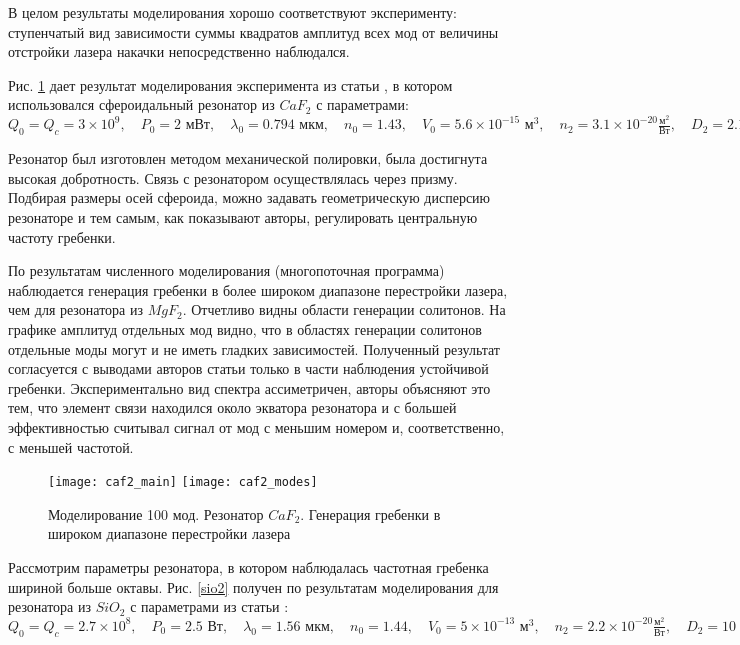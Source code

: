 В целом результаты моделирования хорошо соответствуют эксперименту: ступенчатый вид зависимости суммы квадратов амплитуд всех мод от величины отстройки лазера накачки непосредственно наблюдался.

Рис. \ref{caf2} дает результат моделирования эксперимента из статьи \cite{Savchenkov2011}, в котором использовался сфероидальный резонатор из $CaF_2$ с параметрами:
$
Q_0=Q_c=3\times10^9,\quad
P_0=2\text{ мВт},\quad
\lambda_0=0.794\text{ мкм}, \quad
n_0=1.43,\quad
V_0=5.6\times10^{-15}\text{ м}^3,\quad
n_2=3.1\times10^{-20}\frac{\text{м}^2}{\text{Вт}},\quad
D_2=2.1\times10^4\text{ Гц},\quad
D_3=0\text{ Гц}.$

Резонатор был изготовлен методом механической полировки, была достигнута высокая добротность. Связь с резонатором осуществлялась через призму. Подбирая размеры осей сфероида, можно задавать геометрическую дисперсию резонаторе и тем самым, как показывают авторы, регулировать центральную частоту гребенки.

По результатам численного моделирования (многопоточная программа) наблюдается генерация гребенки в более широком диапазоне перестройки лазера, чем для резонатора из $MgF_2$. Отчетливо видны области генерации солитонов. На графике амплитуд отдельных мод видно, что в областях генерации солитонов отдельные моды могут и не иметь гладких зависимостей. Полученный результат согласуется с выводами авторов статьи только в части наблюдения устойчивой гребенки. Экспериментально вид спектра ассиметричен, авторы объясняют это тем, что элемент связи находился около экватора резонатора и с большей эффективностью считывал сигнал от мод с меньшим номером и, соответственно, с меньшей частотой.

\begin{figure}
  \texttt{[image: caf2\_main]}
  \texttt{[image: caf2\_modes]}
  \caption{Моделирование 100 мод. Резонатор $CaF_2$. Генерация гребенки в широком диапазоне перестройки лазера} \label{caf2}
\end{figure}

Рассмотрим параметры резонатора, в котором наблюдалась частотная гребенка шириной больше октавы. Рис. \ref{sio2} получен по результатам моделирования для резонатора из $SiO_2$ с параметрами из статьи \cite{DelHaye2011} :
$
Q_0=Q_c=2.7\times10^8,\quad
P_0=2.5\text{ Вт},\quad
\lambda_0=1.56\text{ мкм}, \quad
n_0=1.44,\quad
V_0=5\times10^{-13}\text{ м}^3,\quad
n_2=2.2\times10^{-20}\frac{\text{м}^2}{\text{Вт}},\quad
D_2=10\times10^6\text{ Гц},\quad
D_3=0.$

